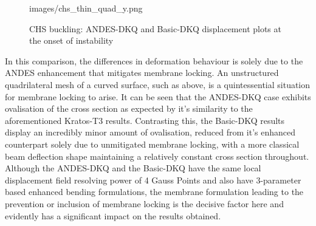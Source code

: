 \begin{figure}[H]
{	{images/chs_thin_quad_y.png}}
	\caption{\label{chs buckling pics2}CHS buckling: ANDES-DKQ and Basic-DKQ displacement plots at the onset of instability}
\end{figure}

In this comparison, the differences in deformation behaviour is solely due to the ANDES enhancement that mitigates membrane locking. An unstructured quadrilateral mesh of a curved surface, such as above, is a quintessential situation for membrane locking to arise. It can be seen that the ANDES-DKQ case exhibits ovalisation of the cross section as expected by it's similarity to the aforementioned Kratos-T3 results. Contrasting this, the Basic-DKQ results display an incredibly minor amount of ovalisation, reduced from it's enhanced counterpart solely due to unmitigated membrane locking, with a more classical beam deflection shape maintaining a relatively constant cross section throughout. Although the ANDES-DKQ and the Basic-DKQ have the same local displacement field resolving power of 4 Gauss Points and also have 3-parameter based enhanced bending formulations, the membrane formulation leading to the prevention or inclusion of membrane locking is the decisive factor here and evidently has a significant impact on the results obtained.


